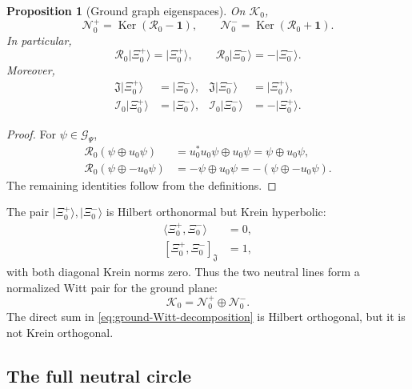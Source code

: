 \documentclass[11pt,reqno]{scrartcl}
\newcommand{\fundJ}{\mathfrak J}
\newcommand{\GzeroP}{\mathscr G_{\Psi}}
\newcommand{\Kzero}{\mathscr K_{0}}
\newcommand{\idop}{\mathbf 1}
\newcommand{\uzero}{u_{0}}
\newcommand{\Rzero}{\mathcal R_{0}}
\newcommand{\Izero}{\mathcal I_{0}}
\newcommand{\NzeroPlus}{\mathscr N_{0}^{+}}
\newcommand{\NzeroMinus}{\mathscr N_{0}^{-}}
\newcommand{\ket}[1]{\lvert #1\rangle}
\newcommand{\inner}[2]{\langle #1,#2\rangle}
\newcommand{\kInner}[2]{[#1,#2]_{\fundJ}}
\DeclareMathOperator{\Ker}{Ker}
\theoremstyle{plain}
\newtheorem{proposition}[proposition]{Proposition}
\theoremstyle{definition}
\theoremstyle{remark}
\begin{document}
\begin{proposition}[Ground graph eigenspaces]
\label{prop:ground-graph-eigenspaces}
On \(\Kzero\),
\begin{equation}
  \NzeroPlus=\Ker(\Rzero-\idop),
  \qquad
  \NzeroMinus=\Ker(\Rzero+\idop).
  \label{eq:N0-R0-eigenspaces}
\end{equation}
In particular,
\begin{equation}
  \Rzero\ket{\Xi_0^+}=\ket{\Xi_0^+},
  \qquad
  \Rzero\ket{\Xi_0^-}=-\ket{\Xi_0^-}.
  \label{eq:R0-Xi-eigenvalues}
\end{equation}
Moreover,
\begin{align}
  \fundJ\ket{\Xi_0^+}&=\ket{\Xi_0^-},
  &\fundJ\ket{\Xi_0^-}&=\ket{\Xi_0^+},
  \label{eq:J-exchanges-Xi}\\
  \Izero\ket{\Xi_0^+}&=\ket{\Xi_0^-},
  &\Izero\ket{\Xi_0^-}&=-\ket{\Xi_0^+}.
  \label{eq:I0-quarter-turn-Xi}
\end{align}
\end{proposition}

\begin{proof}
For \(\psi\in\GzeroP\),
\begin{align}
  \Rzero(\psi\oplus\uzero\psi)
  &=\uzero^*\uzero\psi\oplus\uzero\psi
   =\psi\oplus\uzero\psi,\\
  \Rzero(\psi\oplus-\uzero\psi)
  &=-\psi\oplus\uzero\psi
   =-(\psi\oplus-\uzero\psi).
\end{align}
The remaining identities follow from the definitions.
\end{proof}

The pair \(\ket{\Xi_0^+},\ket{\Xi_0^-}\) is Hilbert orthonormal but Krein
hyperbolic:
\begin{align}
  \inner{\Xi_0^+}{\Xi_0^-}&=0,
  \label{eq:Xi-Hilbert-orthogonal}\\
  \kInner{\Xi_0^+}{\Xi_0^-}&=1,
  \label{eq:Xi-Krein-cross-pairing}
\end{align}
with both diagonal Krein norms zero.  Thus the two neutral lines form a
normalized Witt pair for the ground plane:
\begin{equation}
  \Kzero=\NzeroPlus\oplus\NzeroMinus.
  \label{eq:ground-Witt-decomposition}
\end{equation}
The direct sum in \eqref{eq:ground-Witt-decomposition} is Hilbert orthogonal,
but it is not Krein orthogonal.

\subsection{The full neutral circle}
\end{document}
